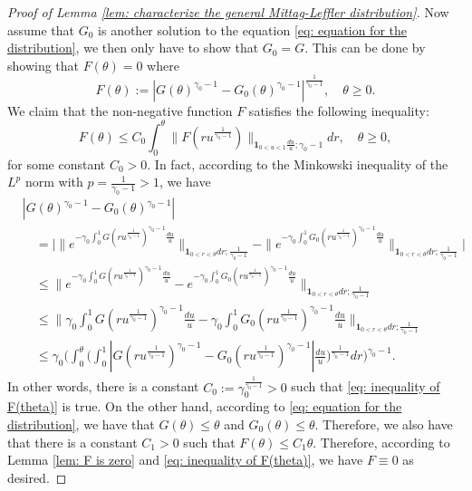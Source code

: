 \documentclass[12pt, a4paper]{amsart}
\theoremstyle{definition}
\numberwithin{equation}{section}
\begin{document}
\begin{proof}[Proof of Lemma \ref{lem: characterize the general Mittag-Leffler distribution}]
	Now assume that $G_0$ is another solution to the equation \eqref{eq: equation for the distribution}, we then only have to show that $G_0 = G$.
	This can be done by showing that $F(\theta) = 0$ where
\[
		F(\theta) := |G(\theta)^{\gamma_0 - 1} - G_0(\theta)^{\gamma_0 - 1}|^{\frac{1}{\gamma_0 - 1}},
		\quad \theta \geq 0.
\]
	We claim that the non-negative function $F$ satisfies
	the following inequality:
\[\label{eq: inequality of F(theta)}
	F(\theta)
	\leq C_0 \int_0^\theta \|  F(ru^{\frac{1}{\gamma_0 - 1}})\|_{\mathbf 1_{0<u<1}\frac{du}{u}; \gamma_0 - 1} dr, \quad \theta \geq 0,
\]
	for some constant $C_0 > 0$.
	In fact, according to the Minkowski inequality of the $L^p$ norm with $p = \frac{1}{\gamma_0 - 1} > 1$, we have
\[\begin{split}
	&|G(\theta)^{\gamma_0 - 1} - G_0(\theta)^{\gamma_0 - 1}|
	\\&\quad = \Big| \|e^{-\gamma_0\int_0^1 G(ru^{\frac{1}{\gamma_0 - 1}})^{\gamma_0 - 1} \frac{du}{u}} \|_{\mathbf 1_{0<r<\theta}dr;\frac{1}{\gamma_0 - 1}} - \|e^{-\gamma_0\int_0^1 G_0(ru^{\frac{1}{\gamma_0 - 1}})^{\gamma_0 - 1} \frac{du}{u}} \|_{\mathbf 1_{0<r<\theta}dr;\frac{1}{\gamma_0 - 1}} \Big|
	\\ & \quad \leq \| e^{-\gamma_0\int_0^1 G(ru^{\frac{1}{\gamma_0 - 1}})^{\gamma_0 - 1} \frac{du}{u}} - e^{-\gamma_0\int_0^1 G_0(ru^{\frac{1}{\gamma_0 - 1}})^{\gamma_0 - 1} \frac{du}{u}} \|_{\mathbf 1_{0<r<\theta}dr;\frac{1}{\gamma_0 - 1}}
	\\ & \quad \leq \Big\| \gamma_0\int_0^1 G(ru^{\frac{1}{\gamma_0 - 1}})^{\gamma_0 - 1} \frac{du}{u} - \gamma_0\int_0^1 G_0(ru^{\frac{1}{\gamma_0 - 1}})^{\gamma_0 - 1} \frac{du}{u} \Big\|_{\mathbf 1_{0<r<\theta}dr;\frac{1}{\gamma_0 - 1}}
	\\ & \quad \leq \gamma_0 \Bigg( \int_0^\theta \Big( \int_0^1 |G(ru^{\frac{1}{\gamma_0 - 1}})^{\gamma_0 - 1} - G_0(ru^{\frac{1}{\gamma_0 - 1}})^{\gamma_0 - 1}| \frac{du}{u} \Big)^{\frac{1}{\gamma_0 - 1}} dr \Bigg)^{\gamma_0 - 1}.
\end{split}\]
	In other words, there is a constant $C_0:= \gamma_0^{\frac{1}{\gamma_0 - 1}}>0$ such that \eqref{eq: inequality of F(theta)} is true.
	On the other hand, according to \eqref{eq: equation for the distribution},
	we have that $G(\theta) \leq \theta$ and $G_0(\theta) \leq \theta$.
	Therefore, we also have that there is a constant $C_1 > 0$ such that $F(\theta) \leq C_1 \theta$.
	Therefore, according to Lemma \ref{lem: F is zero} and \eqref{eq: inequality of F(theta)}, we have $F \equiv 0$ as desired.
\end{proof}
\end{document}
